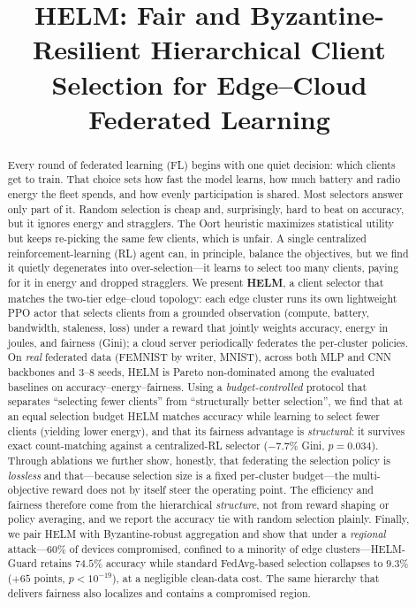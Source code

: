 \documentclass[conference]{IEEEtran}
\begin{document}
\title{HELM: Fair and Byzantine-Resilient Hierarchical Client Selection
for Edge--Cloud Federated Learning}

\author{
}

\maketitle

\begin{abstract}
Every round of federated learning (FL) begins with one quiet decision: which
clients get to train. That choice sets how fast the model learns, how much
battery and radio energy the fleet spends, and how evenly participation is
shared. Most selectors answer only part of it. Random selection is cheap and,
surprisingly, hard to beat on accuracy, but it ignores energy and stragglers.
The Oort heuristic maximizes statistical utility but keeps re-picking the same
few clients, which is unfair. A single centralized reinforcement-learning (RL)
agent can, in principle, balance the objectives, but we find it quietly
degenerates into over-selection---it learns to select too many clients, paying
for it in energy and dropped stragglers. We present \textbf{HELM}, a client
selector that matches the two-tier edge--cloud topology: each edge cluster runs
its own lightweight PPO actor that selects clients from a grounded observation
(compute, battery, bandwidth, staleness, loss) under a reward that jointly
weights accuracy, energy in joules, and fairness (Gini); a cloud server
periodically federates the per-cluster policies. On \emph{real} federated data
(FEMNIST by writer, MNIST), across both MLP and CNN backbones and 3--8 seeds,
HELM is Pareto non-dominated among the evaluated baselines on
accuracy--energy--fairness. Using a \emph{budget-controlled} protocol that
separates ``selecting fewer clients'' from ``structurally better selection'', we
find that at an equal selection budget HELM matches accuracy while learning to
select fewer clients (yielding lower energy), and that its fairness advantage is
\emph{structural}: it survives exact count-matching against a centralized-RL
selector ($-7.7\%$ Gini, $p{=}0.034$). Through ablations we further show, honestly,
that federating the selection policy is \emph{lossless} and that---because
selection size is a fixed per-cluster budget---the multi-objective reward does not
by itself steer the operating point. The efficiency and fairness therefore come
from the hierarchical \emph{structure}, not from reward shaping or policy
averaging, and we report the accuracy tie with random selection plainly.
Finally, we pair HELM with Byzantine-robust aggregation and show that under a
\emph{regional} attack---60\% of devices compromised, confined to a minority of
edge clusters---HELM-Guard retains $74.5\%$ accuracy while standard FedAvg-based
selection collapses to $9.3\%$ ($+65$ points, $p{<}10^{-19}$), at a negligible
clean-data cost. The same hierarchy that delivers fairness also localizes and
contains a compromised region.
\end{abstract}
\end{document}
